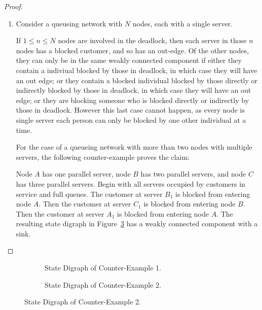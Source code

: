 \documentclass{article}
\begin{document}
\begin{proof}
\begin{enumerate}
\item Consider a queueing network with $N$ nodes, each with a single server.

If $1 \leq n \leq N$ nodes are involved in the deadlock, then each server in those $n$ nodes has a blocked customer, and so has an out-edge.
Of the other nodes, they can only be in the same weakly connected component if either they contain a indiviual blocked by those in deadlock, in which case they will have an out edge; or they contain a blocked individual blocked by those directly or indirectly blocked by those in deadlock, in which case they will have an out edge; or they are blocking someone who is blocked directly or indirectly by those in deadlock.
However this last case cannot happen, as every node is single server each person can only be blocked by one other individual at a time.

For the case of a queueing network with more than two nodes with multiple servers, the following counter-example proves the claim:

Node $A$ has one parallel server, node $B$ has two parallel servers, and node $C$ has three parallel servers.
Begin with all servers occupied by customers in service and full queues.
The customer at server $B_1$ is blocked from entering node $A$.
Then the customer at server $C_1$ is blocked from entering node $B$.
Then the customer at server $A_1$ is blocked from entering node $A$.
The resulting state digraph in Figure~\ref{fig:counter_example_2} has a weakly connected component with a sink.

\end{enumerate}

\end{proof}

\begin{figure}
\begin{subfigure}{0.5\textwidth}
\begin{center}

\end{center}
\caption{State Digraph of Counter-Example 1.}
\label{fig:counter_example_1}
\end{subfigure}
\begin{subfigure}{0.5\textwidth}
\begin{center}

\end{center}
\caption{State Digraph of Counter-Example 2.}
\label{fig:counter_example_2}
\end{subfigure}
\end{figure}
\end{document}
